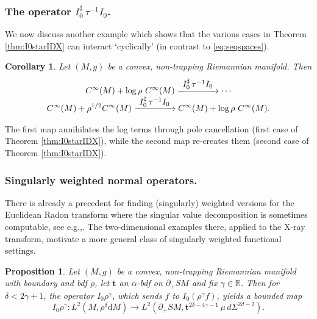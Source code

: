 \documentclass[11pt]{article}
\newcommand{\eg}{e.g.,\xspace}
\def\To#1{\mathchoice{\xrightarrow{\textstyle\kern4pt#1\kern3pt}}{\stackrel{#1}{\longrightarrow}}{}{}}
\theoremstyle{plain}
\newtheorem{Corollary}[Theorem]{Corollary}
\newtheorem{Proposition}[Theorem]{Proposition}
\theoremstyle{definition}
\theoremstyle{remark}
\def\Rm{{\mathbb{R}}}
\newcommand{\bt}{{\boldsymbol{t}}}
\newcommand{\adj}{I_0^\sharp}
\newcommand {\dM}{\mathrm{d}M}
\begin{document}
\subsubsection*{The operator $\adj \, \tau^{-1} I_0$.}
We now discuss another example which shows that the various cases in Theorem \ref{thm:I0starIDX} can interact `cyclically' (in contrast to \eqref{eq:seqspaces}).

\begin{Corollary}
Let $(M,g)$ be a convex, non-trapping Riemannian manifold. Then
\begin{multline*}
C^\infty(M) + \log\rho\ C^\infty(M) \To{\adj \, \tau^{-1} I_0} \cdots\\[-5pt]
C^\infty(M) + \rho^{1/2} C^\infty (M) \To{\adj \, \tau^{-1} I_0} C^\infty(M) + \log\rho\ C^\infty(M).
\end{multline*}
\end{Corollary}
The first map annihilates the log terms through pole cancellation (first case of Theorem \ref{thm:I0starIDX}), while the second map re-creates them (second case of Theorem \ref{thm:I0starIDX}).

\subsubsection*{Singularly weighted normal operators.}

There is already a precedent for finding (singularly) weighted versions for the Euclidean Radon transform where the singular value decomposition
is sometimes computable, see \eg \cite{Louis1984}. The two-dimensional examples there, applied to the X-ray transform, motivate a more
general class of singularly weighted functional settings.

\begin{Proposition}\label{prop:weightedI0}
Let $(M,g)$ be a convex, non-trapping Riemannian manifold with boundary and bdf $\rho$, let $\bt$ an $\alpha$-bdf on $\partial_+ SM$ and fix $\gamma\in\Rm$. Then
for $\delta<2\gamma+1$, the operator $I_0 \rho^\gamma$, which sends $f$ to $I_0 (\rho^\gamma f)$, yields a bounded map
\begin{equation*}
I_0 \rho^{\gamma} \colon L^2(M, \rho^{\delta}\dM) \to L^2(\partial_+ SM, \bt^{2\delta-4\gamma-1}\, \mu \, d\Sigma^{2d-2}).
\end{equation*}
\end{Proposition}
\end{document}
